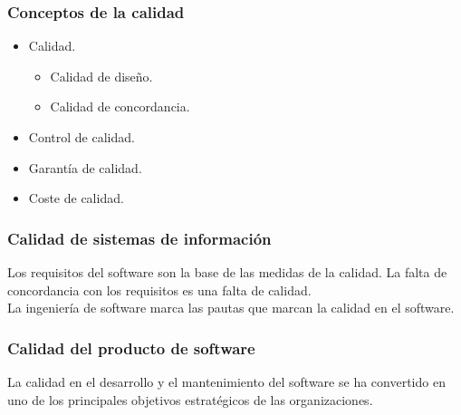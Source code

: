\documentclass[12pt,twoside]{article}
\begin{document}
\subsubsection{Conceptos de la calidad}
\begin{itemize}
    \item Calidad.
    \begin{itemize}
        \item Calidad de diseño.
        \item Calidad de concordancia.
    \end{itemize}
    \item Control de calidad.
    \item Garantía de calidad.
    \item Coste de calidad.
\end{itemize}
\subsubsection{Calidad de sistemas de información}
Los requisitos del software son la base de las medidas de la calidad. La falta de 
concordancia con los requisitos es una falta de calidad.\\
La ingeniería de software marca las pautas que marcan la calidad en el software.\\
\subsubsection{Calidad del producto de software}
La calidad en el desarrollo y el mantenimiento del software se ha convertido en uno 
de los principales objetivos estratégicos de las organizaciones. \\
\end{document}
